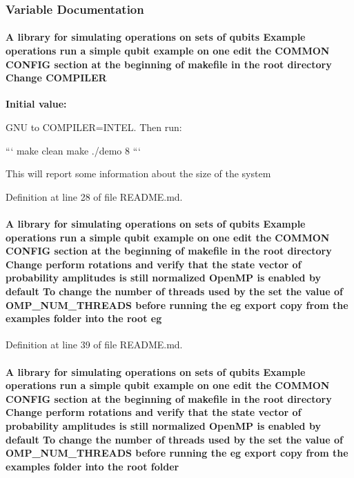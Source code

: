 \subsubsection{Variable Documentation}
\hypertarget{README_8md_ad6a8565e90f4cb2414688c39bcf9efa8}{
\paragraph[{COMPILER}]{\setlength{\rightskip}{0pt plus 5cm}A library for simulating operations on sets of qubits Example operations run a simple qubit example on one edit the COMMON CONFIG section at the beginning of makefile in the root directory Change {\bf COMPILER}}\hfill}
\label{README_8md_ad6a8565e90f4cb2414688c39bcf9efa8}
{\bfseries Initial value:}
\begin{DoxyCode}
GNU to COMPILER=INTEL. Then run:

```
make clean
make
./demo 8
```

This will report some information about the size of the system
\end{DoxyCode}


Definition at line 28 of file README.md.\hypertarget{README_8md_accf5ef1dd79776855485925f622a4f09}{
\paragraph[{eg}]{\setlength{\rightskip}{0pt plus 5cm}A library for simulating operations on sets of qubits Example operations run a simple qubit example on one edit the COMMON CONFIG section at the beginning of makefile in the root directory Change perform {\bf rotations} and verify that the state vector of probability amplitudes {\bf is} still normalized OpenMP {\bf is} enabled by default To change the number of threads used by the set the value of {\bf OMP\_\-NUM\_\-THREADS} before running the {\bf eg} export copy from the examples {\bf folder} into the root {\bf eg}}\hfill}
\label{README_8md_accf5ef1dd79776855485925f622a4f09}


Definition at line 39 of file README.md.\hypertarget{README_8md_ac7a6c2e0f131857c641dc6c0bc4a395a}{
\paragraph[{folder}]{\setlength{\rightskip}{0pt plus 5cm}A library for simulating operations on sets of qubits Example operations run a simple qubit example on one edit the COMMON CONFIG section at the beginning of makefile in the root directory Change perform {\bf rotations} and verify that the state vector of probability amplitudes {\bf is} still normalized OpenMP {\bf is} enabled by default To change the number of threads used by the set the value of {\bf OMP\_\-NUM\_\-THREADS} before running the {\bf eg} export copy from the examples {\bf folder} into the root {\bf folder}}\hfill}
\label{README_8md_ac7a6c2e0f131857c641dc6c0bc4a395a}



